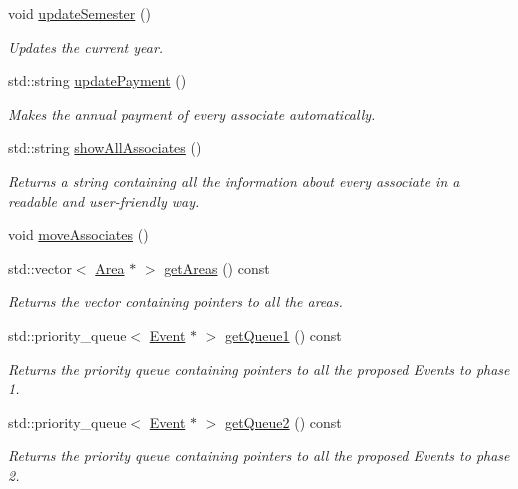\begin{DoxyCompactItemize}
void \mbox{\hyperlink{classAssociation_aa018edd1d345ca144f648096df9e9bf4}{update\+Semester}} ()
\begin{DoxyCompactList}\small\item\em Updates the current year. \end{DoxyCompactList}\item 
std\+::string \mbox{\hyperlink{classAssociation_afd8dd744fba29817387841f4b6870c2d}{update\+Payment}} ()
\begin{DoxyCompactList}\small\item\em Makes the annual payment of every associate automatically. \end{DoxyCompactList}\item 
std\+::string \mbox{\hyperlink{classAssociation_a266f2b14cd40429396b93ca29abcbf0c}{show\+All\+Associates}} ()
\begin{DoxyCompactList}\small\item\em Returns a string containing all the information about every associate in a readable and user-\/friendly way. \end{DoxyCompactList}\item 
void \mbox{\hyperlink{classAssociation_ae3c5683c5fb9d62f5bf2b9d38be3c8dc}{move\+Associates}} ()
\item 
std\+::vector$<$ \mbox{\hyperlink{classArea}{Area}} $\ast$ $>$ \mbox{\hyperlink{classAssociation_a46f83e00e0201f25129a5c8167969661}{get\+Areas}} () const
\begin{DoxyCompactList}\small\item\em Returns the vector containing pointers to all the areas. \end{DoxyCompactList}\item 
std\+::priority\+\_\+queue$<$ \mbox{\hyperlink{classEvent}{Event}} $\ast$ $>$ \mbox{\hyperlink{classAssociation_a595bd9c5abaf1ceaa62ac8fb70d359c6}{get\+Queue1}} () const
\begin{DoxyCompactList}\small\item\em Returns the priority queue containing pointers to all the proposed Events to phase 1. \end{DoxyCompactList}\item 
std\+::priority\+\_\+queue$<$ \mbox{\hyperlink{classEvent}{Event}} $\ast$ $>$ \mbox{\hyperlink{classAssociation_a1600f284c97b98836cac69fc4b21d5f6}{get\+Queue2}} () const
\begin{DoxyCompactList}\small\item\em Returns the priority queue containing pointers to all the proposed Events to phase 2. \end{DoxyCompactList}\item 

\end{DoxyCompactItemize}
